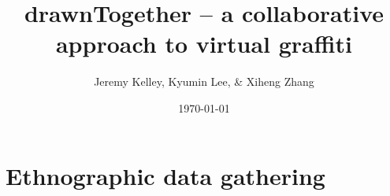 \documentclass{www2010-submission}
\begin{document}
\setlength{\parindent}{0pt}
\setlength{\parskip}{.5ex plus 0.5ex minus 0.2ex}




\title{ drawnTogether -- a collaborative approach to virtual graffiti }

\author{ Jeremy Kelley, Kyumin Lee, \& Xiheng Zhang }

\date{\today}

\maketitle

\section{ Ethnographic data gathering }
\end{document}
